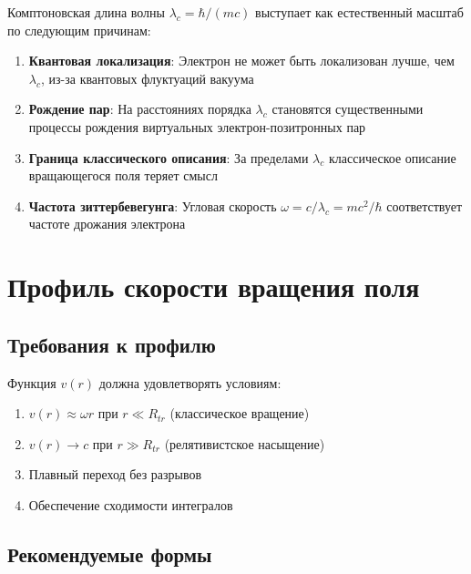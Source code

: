 \documentclass[12pt,a4paper]{article}
\begin{document}
Комптоновская длина волны $\lambda_c = \hbar/(mc)$ выступает как естественный масштаб по следующим причинам:

\begin{enumerate}
    \item \textbf{Квантовая локализация}: Электрон не может быть локализован лучше, чем $\lambda_c$, из-за квантовых флуктуаций вакуума

    \item \textbf{Рождение пар}: На расстояниях порядка $\lambda_c$ становятся существенными процессы рождения виртуальных электрон-позитронных пар

    \item \textbf{Граница классического описания}: За пределами $\lambda_c$ классическое описание вращающегося поля теряет смысл

    \item \textbf{Частота зиттербевегунга}: Угловая скорость $\omega = c/\lambda_c = mc^2/\hbar$ соответствует частоте дрожания электрона
\end{enumerate}

\section{Профиль скорости вращения поля}

\subsection{Требования к профилю}

Функция $v(r)$ должна удовлетворять условиям:

\begin{enumerate}
    \item $v(r) \approx \omega r$ при $r \ll R_{tr}$ (классическое вращение)
    \item $v(r) \to c$ при $r \gg R_{tr}$ (релятивистское насыщение)
    \item Плавный переход без разрывов
    \item Обеспечение сходимости интегралов
\end{enumerate}

\subsection{Рекомендуемые формы}
\end{document}
